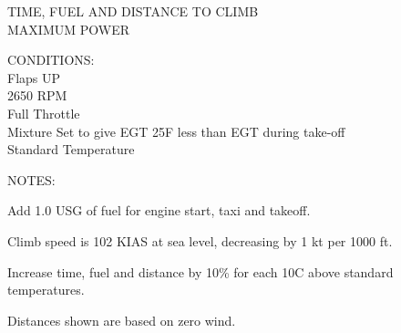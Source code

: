 \begin{figure}[t]
\begin{center}
\begin{perfhdr}TIME, FUEL AND DISTANCE TO CLIMB\\
MAXIMUM POWER\\
\end{perfhdr}
\Large
\normalsize \vspace{5ex} 
\raggedright 
    CONDITIONS:\\
    Flaps UP\\
    2650 RPM\\
    Full Throttle\\
    Mixture Set to give EGT 25\textdegree F less than EGT during take-off\\
    Standard Temperature\\

\hfill

\vspace{\perfnoteskip}
    \raggedright NOTES:
    \begin{enumerate*}
      \item Add 1.0 USG of fuel for engine start, taxi and takeoff.
      \item Climb speed is 102 KIAS at sea level, decreasing by 1 kt per 1000 ft.
      \item Increase time, fuel and distance by 10\% for each 10\textdegree C above standard
      temperatures.
      \item Distances shown are based on zero wind.
      \end{enumerate*}

\vspace{\perfnoteskip}
\settowidth{\colOne}{WEIGHT}
\settowidth{\colTwo}{PRESS.}
\settowidth{\colThree}{TEMP}
\settowidth{\colFour}{CLIMB}
\settowidth{\colFive}{RATE OF}
\settowidth{\colSix}{TIME}
\settowidth{\colSeven}{USED}
\settowidth{\colEight}{DIST.}


\end{center}
\end{figure}
